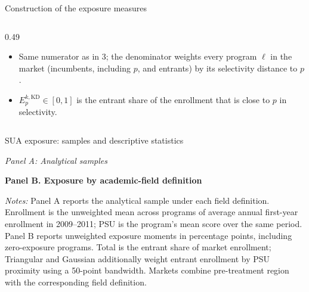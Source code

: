 \documentclass{beamer}
\begin{document}
\begin{frame}{Construction of the exposure measures}
\begin{columns}[T,onlytextwidth]
\begin{column}{0.49\textwidth}
\vspace{-0.1cm}

\begin{itemize}
\tiny
\setlength{\itemsep}{0pt}

\item Same numerator as in 3; the denominator weights every program $\ell$
in the market (incumbents, including $p$, and entrants) by its
selectivity distance to $p$.

\item $E_p^{k,\mathrm{KD}}\in[0,1]$ is the entrant share of the enrollment
that is close to $p$ in selectivity.

\end{itemize}
\end{column}

\end{columns}

\end{frame}

\begin{frame}{SUA exposure: samples and descriptive statistics}

\begin{table}
\centering
\tiny

\renewcommand{\arraystretch}{0.95}

\textit{Panel A: Analytical samples}

\vspace{0.02cm}

\resizebox{0.70\textwidth}{!}{

}

\vspace{0.08cm}

\textbf{Panel B. Exposure by academic-field definition}

\vspace{0.03cm}

\resizebox{0.70\textwidth}{!}{

}

\vspace{0.06cm}

\parbox{0.94\textwidth}{
\tiny
\textit{Notes:}
Panel A reports the analytical sample under each field definition.
Enrollment is the unweighted mean across programs of average annual
first-year enrollment in 2009--2011; PSU is the program's mean score over
the same period. Panel B reports unweighted exposure moments in percentage
points, including zero-exposure programs. Total is the entrant share of
market enrollment; Triangular and Gaussian additionally weight entrant
enrollment by PSU proximity using a 50-point bandwidth. Markets combine
pre-treatment region with the corresponding field definition.
}

\end{table}

\end{frame}
\end{document}
